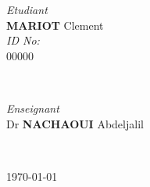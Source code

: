 \begin{titlepage}
    \begin{minipage}{0.4\textwidth}
    \begin{flushleft} \large
    \emph{Etudiant}\\
     \textbf{MARIOT} Clement %
    \\[1.2em]
    \emph{ID No:}\\
    00000 \\[1.2em]
    \end{flushleft}
    \end{minipage}
    ~
    \begin{minipage}{0.4\textwidth}
    \begin{flushright} \large
    \emph{Enseignant} \\
    Dr \textbf{NACHAOUI} Abdeljalil  \\[1.2em] %
    \end{flushright}
    \end{minipage}\\[2cm]
    \makeatother
    
    
    
    {\large \today}\\[2cm] %
    
    \vfill %
    
    \end{titlepage}